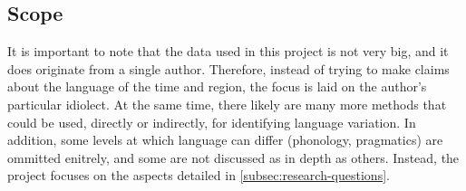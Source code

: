 \subsection{Scope}
\label{subsec:scope}

It is important to note that the data used in this project is not very big, and it does originate from a single author. Therefore, instead of trying to make claims about the language of the time and region, the focus is laid on the author's particular idiolect. At the same time, there likely are many more methods that could be used, directly or indirectly, for identifying language variation. In addition, some levels at which language can differ (phonology, pragmatics) are ommitted enitrely, and some are not discussed as in depth as others. Instead, the project focuses on the aspects detailed in \autoref{subsec:research-questions}. 
